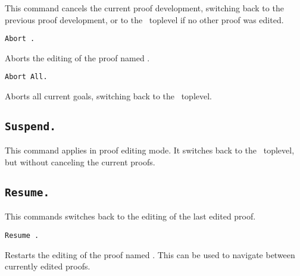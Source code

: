 This command cancels the current proof development, switching back to
the previous proof development, or to the \Coq\ toplevel if no other
proof was edited.

\begin{ErrMsgs}
\item {}
\end{ErrMsgs}

\begin{Variants}

\item {\tt Abort {\ident}.}

  Aborts the editing of the proof named {\ident}.

\item {\tt Abort All.}

  Aborts all current goals, switching back to the \Coq\ toplevel.

\end{Variants}

\subsection[\tt Suspend.]{\tt Suspend.}

This command applies in proof editing mode. It switches back to the
\Coq\ toplevel, but without canceling the current proofs.

\subsection[\tt Resume.]{\tt Resume.\label{Resume}}

This commands switches back to the editing of the last edited proof.

\begin{ErrMsgs}
\item {}
\end{ErrMsgs}

\begin{Variants}

\item {\tt Resume {\ident}.}

  Restarts the editing of the proof named {\ident}. This can be used
  to navigate between currently edited proofs.

\end{Variants}

\begin{ErrMsgs}
\item {}
\end{ErrMsgs}

